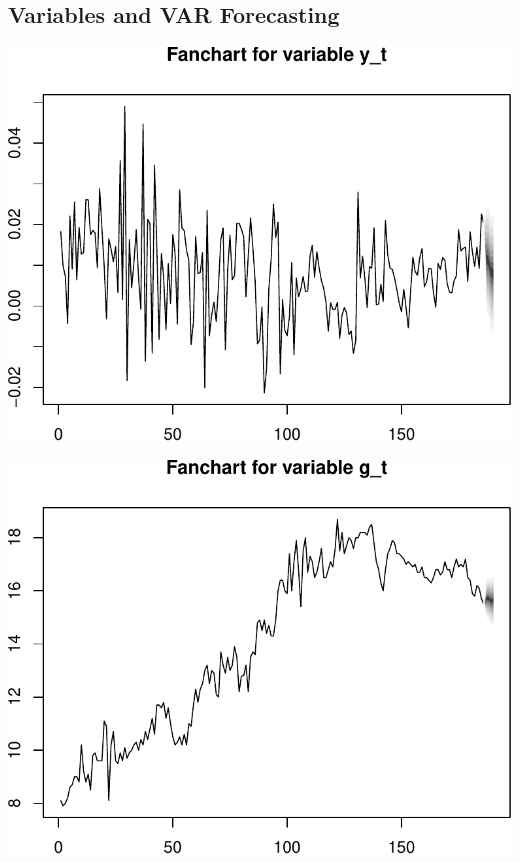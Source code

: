 \documentclass[11pt,preprint, authoryear]{elsarticle}
\numberwithin{equation}{section}
\numberwithin{figure}{section}
\numberwithin{table}{section}
\begin{document}
\hypertarget{variables-and-var-forecasting}{%
\subsection{Variables and VAR
Forecasting}\label{variables-and-var-forecasting}}

\includegraphics{TS_proj_files/figure-latex/unnamed-chunk-15-1.pdf}

\includegraphics{TS_proj_files/figure-latex/unnamed-chunk-16-1.pdf}
\end{document}
